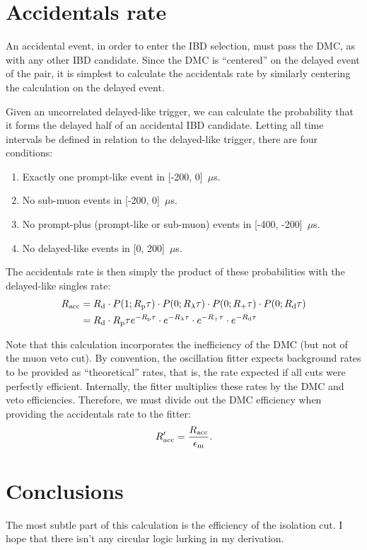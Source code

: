 \documentclass[../thesis.tex]{subfiles}
\begin{document}
\section{Accidentals rate}
\label{sec:accratecalc}

An accidental event, in order to enter the IBD selection, must pass the DMC, as with any other IBD candidate. Since the DMC is ``centered'' on the delayed event of the pair, it is simplest to calculate the accidentals rate by similarly centering the calculation on the delayed event.

Given an uncorrelated delayed-like trigger, we can calculate the probability that it forms the delayed half of an accidental IBD candidate. Letting all time intervals be defined in relation to the delayed-like trigger, there are four conditions:
\begin{enumerate}
\item Exactly one prompt-like event in [-200, 0]~$\mu$s.
\item No sub-muon events in [-200, 0]~$\mu$s.
\item No prompt-plus (prompt-like or sub-muon) events in [-400, -200]~$\mu$s.
\item No delayed-like events in [0, 200]~$\mu$s.
\end{enumerate}
The accidentals rate is then simply the product of these probabilities with the delayed-like singles rate:
\begin{align}
  R_\mathrm{acc} &= R_\mathrm{d} \cdot P(1; R_\mathrm{p} \tau)\cdot P(0; R_\mathrm{\lambda} \tau)\cdot P(0; R_\mathrm{+} \tau)\cdot P(0; R_\mathrm{d} \tau) \nonumber \\
        &= R_\mathrm{d}\cdot R_\mathrm{p}\tau e^{-R_\mathrm{p}\tau}\cdot e^{-R_\mathrm{\lambda}\tau}\cdot e^{-R_\mathrm{+}\tau} \cdot e^{-R_\mathrm{d}\tau}
\end{align}

Note that this calculation incorporates the inefficiency of the DMC (but not of the muon veto cut). By convention, the oscillation fitter expects background rates to be provided as ``theoretical'' rates, that is, the rate expected if all cuts were perfectly efficient. Internally, the fitter multiplies these rates by the DMC and veto efficiencies. Therefore, we must divide out the DMC efficiency when providing the accidentals rate to the fitter:
\begin{equation}
  R_\mathrm{acc}' = \frac{R_\mathrm{acc}}{\epsilon_\mathrm{m}}.
\end{equation}

\section{Conclusions}
\label{sec:accdmcconcl}

The most subtle part of this calculation is the efficiency of the isolation cut. I hope that there isn't any circular logic lurking in my derivation.
\end{document}
